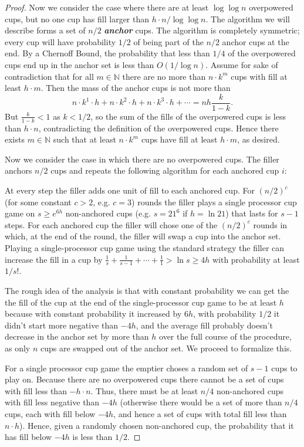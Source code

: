 \documentclass[twocolumn]{article}[11pt]
\newcommand{\defn}[1]{{\textit{\textbf{\boldmath #1}}}}
\begin{document}
\begin{proof}
  Now we consider the case where there are at least $\log\log n$ overpowered
  cups, but no one cup has fill larger than $h\cdot n / \log\log n$. The
  algorithm we will describe forms a set of $n/2$ \defn{anchor} cups. The
  algorithm is completely symmetric; every cup will have probability $1/2$ of being
  part of the $n/2$ anchor cups at the end. By a Chernoff Bound, the probability that less
  than $1/4$ of the overpowered cups end up in the anchor set is less than
  $O(1/\log n)$. Assume for sake of contradiction that for all $m \in
  \mathbb{N}$ there are no more than $n\cdot k^m$ cups with fill at least $h\cdot m$.
  Then the mass of the anchor cups is not more than
  $$n\cdot k^1 \cdot h+ n\cdot k^2 \cdot h+ n\cdot k^3 \cdot h+ \cdots = nh\frac{k}{1-k}.$$
  But $\frac{k}{1-k} < 1$ as $k < 1/2$, so the sum of the fills of the
  overpowered cups is less than $h\cdot n$, contradicting the definition of the
  overpowered cups. Hence there exists $m\in\mathbb{N}$ such that at least $n\cdot k^m$ cups
  have fill at least $h\cdot m$, as desired.

  Now we consider the case in which there are no overpowered cups.
  The filler anchors $n/2$ cups and repeats the following algorithm for each
  anchored cup $i$: 

  At every step the filler adds one unit of fill to each anchored cup. For
  $(n/2)^c$ (for some constant $c > 2$, e.g. $c=3$) rounds the filler plays a
  single processor cup game on $s\ge e^{6h}$ non-anchored cups (e.g. $s=21^6$
  if $h=\ln 21$) that lasts for $s-1$ steps. For each anchored cup the filler
  will chose one of the $(n/2)^c$ rounds in which, at the end of the round, the
  filler will swap a cup into the anchor set. Playing a
  single-processor cup game using the standard strategy the filler can increase
  the fill in a cup by $\frac{1}{s} + \frac{1}{s-1} + \cdots + \frac{1}{1} >
  \ln s \ge 4h$ with probability at least $1/s!$. 

  The rough idea of the analysis is that with constant probability we can get
  the the fill of the cup at the end of the single-processor cup game to be at
  least $h$ because with constant probability it increased by $6h$, with
  probability $1/2$ it didn't start more negative than $-4h$, and the average
  fill probably doesn't decrease in the anchor set by more than $h$ over the
  full course of the procedure, as only $n$ cups are swapped out of the anchor
  set. We proceed to formalize this.

  For a single processor cup game the emptier choses a random set of $s-1$ cups
  to play on. Because there are no overpowered cups there cannot be a set of
  cups with fill less than $-h\cdot n$. Thus, there must be at least $n/4$
  non-anchored cups with fill less negative than $-4h$ (otherwise there would be a set
  of more than $n/4$ cups, each with fill below $-4h$, and hence a set of cups
  with total fill less than $n\cdot h$). Hence, given a randomly chosen
  non-anchored cup, the probability that it has fill below $-4h$ is less than
  $1/2$.


\end{proof}
\end{document}
